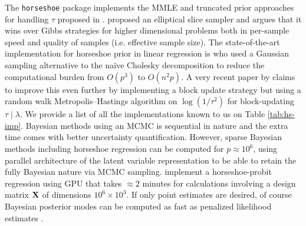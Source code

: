 \documentclass[sts,preprint]{imsart}
\begin{document}
The \texttt{horseshoe} package implements the MMLE and truncated prior approaches for handling $\tau$ proposed in \citet{van2017adaptive}. \citet{hahn_elliptical_2016} proposed an elliptical slice sampler and argues that it wins over Gibbs strategies for higher dimensional problems both in per-sample speed and quality of samples (i.e. effective sample size). The state-of-the-art implementation for horseshoe prior in linear regression is \citet{bhattacharya_fast_2015} who used a Gaussian sampling alternative to the na\"ive Cholesky decomposition to reduce the computational burden from $O(p^3)$ to $O(n^2p)$. A very recent paper by \citet{james2017scalable} claims to improve this even further by implementing a block update strategy but using a random walk Metropolis--Hastings algorithm on $\log(1/\tau^2)$ for block-updating $\tau \mid \lambda$. We provide a list of all the implementations known to us on Table \ref{tab:hs-imp}. 
Bayesian methods using an MCMC is sequential in nature and the extra time comes with better uncertainty quantification. However, sparse Bayesian methods including horseshoe regression can be computed for $p \approx 10^6$, using parallel architecture of the latent variable representation to be able to retain the  fully Bayesian nature via MCMC sampling. \cite{terenin_gpu-accelerated_2016} implement a horseshoe-probit regression using GPU that takes $\approx 2$ minutes for calculations involving a design matrix ${\bf X}$ of dimensions $10^6 \times 10^3$. If only point estimates are desired, of course Bayesian posterior modes can be computed as fast as penalized likelihood estimates \citep{bhadra2017horseshoe}.
\end{document}
